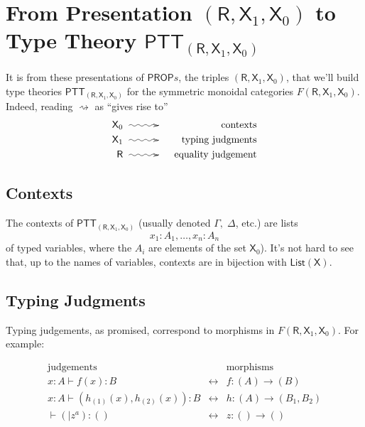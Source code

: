 \documentclass[pra,floatfix,
amsmath,superscriptaddress, 12pt]{article}
\theoremstyle{definition}
\newcommand{\msf}[1]{\mathsf{#1}}
\begin{document}
\section{From Presentation $(\msf{R},\msf{X}_1,\msf{X}_0)$ to Type Theory $\mathsf{PTT}_{(\msf{R},\msf{X}_1,\msf{X}_0)}$}

It is from these presentations of $\mathsf{PROP}s$, the triples $(\msf{R},\msf{X}_1,\msf{X}_0)$, that we'll build type theories $\mathsf{PTT}_{(\msf{R},\msf{X}_1,\msf{X}_0)}$ for the symmetric monoidal categories $F(\msf{R},\msf{X}_1,\msf{X}_0)$. Indeed, reading $\rightsquigarrow$ as ``gives rise to''
    \begin{eqnarray*}
      \msf{X}_0
        & \xymatrix@C=3em{{}\ar@{~>}[r]&{}}
            & \mathrm{contexts} \\
      \msf{X}_1 & \xymatrix@C=3em{{}\ar@{~>}[r]&{}} & \mathrm{typing \ judgments} \\
      \msf{R}   & \xymatrix@C=3em{{}\ar@{~>}[r]&{}} & \mathrm{equality \ judgement}
    \end{eqnarray*}

\subsection{Contexts}

The contexts of $\mathsf{PTT}_{(\msf{R},\msf{X}_1,\msf{X}_0)}$ (usually denoted $\Gamma,\;\Delta$, etc.) are lists
    \[
        x_{1}:A_{1},\dots,x_{n}:A_{n}
    \]
of typed variables, where the $A_i$ are elements of the set $\msf{X}_{0}$). It's not hard to see that, up to the names of variables, contexts are in bijection with $\mathsf{List}(\msf{X})$.

\subsection{Typing Judgments}

Typing judgements, as promised, correspond to morphisms in $F(\msf{R},\msf{X}_1,\msf{X}_0)$. For example:

\begin{eqnarray*}
    \mathrm{judgements}
        &
          &
          \mathrm{morphisms} \\
    x:A\vdash f\left(x\right):B
        &
        \longleftrightarrow
            & f:(A) \longrightarrow (B) \\
    x:A\vdash\left(h_{\left(1\right)}\left(x\right),h_{\left(2\right)}\left(x\right)\right):B
        &
        \longleftrightarrow
            &
            h:(A)\longrightarrow\left(B_{1},B_{2}\right) \\
    \vdash\left(|z^{a}\right):\left(\right)
        &
        \longleftrightarrow
            &
            z:() \longrightarrow ()
\end{eqnarray*}
\end{document}
